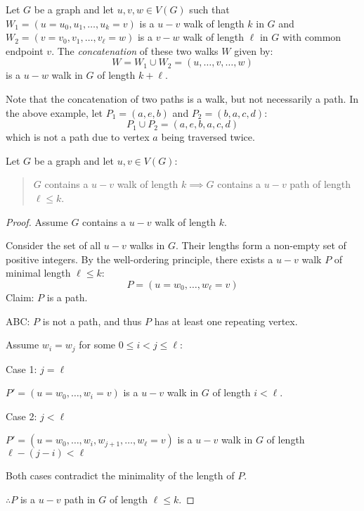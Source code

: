 \documentclass[letterpaper,12pt,fleqn]{article}
\begin{document}
\begin{notation}[Concatenation]
  Let \(G\) be a graph and let \(u,v,w\in V(G)\) such that \(W_1=(u=u_0,u_1,\ldots,u_k=v)\) is a \(u-v\) walk of
  length \(k\) in \(G\) and \(W_2=(v=v_0,v_1,\ldots,v_{\ell}=w)\) is a \(v-w\) walk of length \(\ell\) in \(G\)
  with common endpoint \(v\).  The \emph{concatenation} of these two walks \(W\) given by:
  \[W=W_1\cup W_2=(u,\ldots,v,\ldots,w)\]
  is a \(u-w\) walk in \(G\) of length \(k+\ell\).
\end{notation}

Note that the concatenation of two paths is a walk, but not necessarily a path.  In the above example, let
\(P_1=(a,e,b)\) and \(P_2=(b,a,c,d)\):
\[P_1\cup P_2=(a,e,b,a,c,d)\]
which is not a path due to vertex \(a\) being traversed twice.

\begin{theorem}
  Let \(G\) be a graph and let \(u,v\in V(G)\):
  \begin{quote}
    \(G\) contains a \(u-v\) walk of length \(k\implies G\) contains a \(u-v\) path of length \(\ell\le k\).
  \end{quote}
\end{theorem}

\begin{proof}
  Assume \(G\) contains a \(u-v\) walk of length \(k\).

  Consider the set of all \(u-v\) walks in \(G\).  Their lengths form a non-empty set of positive integers.  By the
  well-ordering principle, there exists a \(u-v\) walk \(P\) of minimal length \(\ell\le k\):
  \[P=(u=w_0,\ldots,w_{\ell}=v)\]
  Claim: \(P\) is a path.

  ABC: \(P\) is not a path, and thus \(P\) has at least one repeating vertex.

  Assume \(w_i=w_j\) for some \(0\le i<j\le\ell\):
  \begin{description}
  \item Case 1: \(j=\ell\)

    \(P'=(u=w_0,\ldots,w_i=v)\) is a \(u-v\) walk in \(G\) of length \(i<\ell\).

  \item Case 2: \(j<\ell\)
    
    \(P'=(u=w_0,\ldots,w_i,w_{j+1},\ldots,w_{\ell}=v)\) is a \(u-v\) walk in \(G\) of length \(\ell-(j-i)<\ell\)
    
  \end{description}

  Both cases contradict the minimality of the length of \(P\).

  \(\therefore P\) is a \(u-v\) path in \(G\) of length \(\ell\le k\).
\end{proof}
\end{document}
